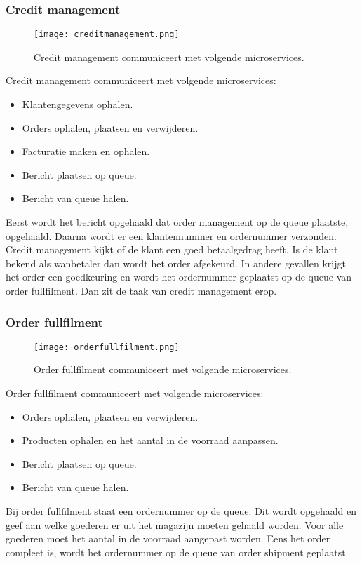 \subsubsection{Credit management}
\begin{figure}[h!]
	\texttt{[image: creditmanagement.png]}
	\caption{Credit management communiceert met volgende microservices.}
	\centering
\end{figure}
Credit management communiceert met volgende microservices:
\begin{itemize}
	\item Klantengegevens ophalen.
	\item Orders ophalen, plaatsen en verwijderen.
	\item Facturatie maken en ophalen.
	\item Bericht plaatsen op queue.
	\item Bericht van queue halen.
\end{itemize}
Eerst wordt het bericht opgehaald dat order management op de queue plaatste, opgehaald. Daarna wordt er een klantennummer en ordernummer verzonden. Credit management kijkt of de klant een goed betaalgedrag heeft. Is de klant bekend als wanbetaler dan wordt het order afgekeurd. In andere gevallen krijgt het order een goedkeuring en wordt het ordernummer geplaatst op de queue van order fullfilment. Dan zit de taak van credit management erop.

\subsubsection{Order fullfilment}
\begin{figure}[h!]
	\texttt{[image: orderfullfilment.png]}
	\caption{Order fullfilment communiceert met volgende microservices.}
	\centering
\end{figure}
Order fullfilment communiceert met volgende microservices:
\begin{itemize}
	\item Orders ophalen, plaatsen en verwijderen.
	\item Producten ophalen en het aantal in de voorraad aanpassen.
	\item Bericht plaatsen op queue.
	\item Bericht van queue halen.
\end{itemize}
Bij order fullfilment staat een ordernummer op de queue. Dit wordt opgehaald en geef aan welke goederen er uit het magazijn moeten gehaald worden. Voor alle goederen moet het aantal in de voorraad aangepast worden. Eens het order compleet is, wordt het ordernummer op de queue van order shipment geplaatst.

